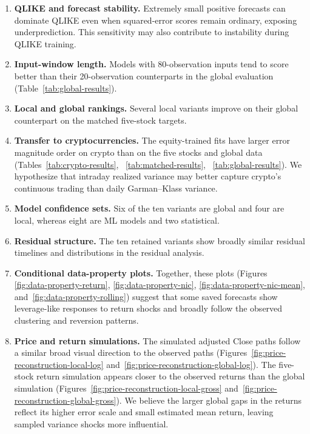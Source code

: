 \documentclass[12pt,a4paper]{article}
\numberwithin{equation}{section}
\numberwithin{table}{section}
\numberwithin{figure}{section}
\begin{document}
\begin{enumerate}
    \item \textbf{QLIKE and forecast stability.} Extremely small positive forecasts can dominate QLIKE even when squared-error scores remain ordinary, exposing underprediction. This sensitivity may also contribute to instability during QLIKE training.
    \item \textbf{Input-window length.} Models with 80-observation inputs tend to score better than their 20-observation counterparts in the global evaluation (Table~\ref{tab:global-results}).
    \item \textbf{Local and global rankings.} Several local variants improve on their global counterpart on the matched five-stock targets.
    \item \textbf{Transfer to cryptocurrencies.} The equity-trained fits have larger error magnitude order on crypto than on the five stocks and global data (Tables~\ref{tab:crypto-results}, ~\ref{tab:matched-results}, ~\ref{tab:global-results}). We hypothesize that intraday realized variance may better capture crypto's continuous trading than daily Garman--Klass variance. 
    \item \textbf{Model confidence sets.} Six of the ten variants are global and four are local, whereas eight are ML models and two statistical. 
    \item \textbf{Residual structure.} The ten retained variants show broadly similar residual timelines and distributions in the residual analysis. 
    \item \textbf{Conditional data-property plots.} Together, these plots (Figures~\\\ref{fig:data-property-return}, \ref{fig:data-property-nic}, \ref{fig:data-property-nic-mean}, and~\ref{fig:data-property-rolling}) suggest that some saved forecasts show leverage-like responses to return shocks and broadly follow the observed clustering and reversion patterns.
    \item \textbf{Price and return simulations.} The simulated adjusted Close paths follow a similar broad visual direction to the observed paths (Figures~\ref{fig:price-reconstruction-local-log} and~\ref{fig:price-reconstruction-global-log}). The five-stock return simulation appears closer to the observed returns than the global simulation (Figures~\ref{fig:price-reconstruction-local-gross} and~\ref{fig:price-reconstruction-global-gross}). We believe the larger global gaps in the returns reflect its higher error scale and small estimated mean return, leaving sampled variance shocks more influential. 

\end{enumerate}
\end{document}
